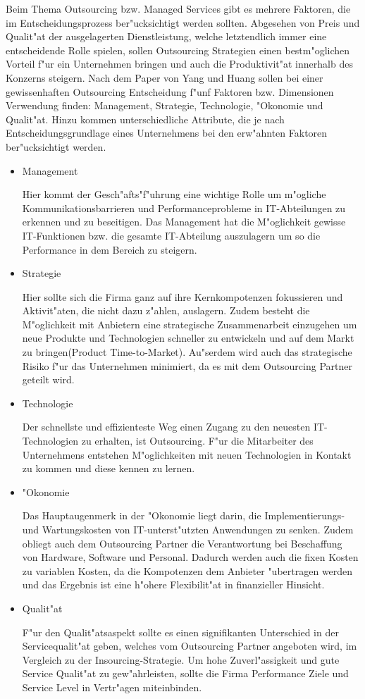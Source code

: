Beim Thema Outsourcing bzw. Managed Services gibt es mehrere Faktoren, die im Entscheidungsprozess ber"ucksichtigt werden sollten. Abgesehen von Preis und Qualit"at der ausgelagerten Dienstleistung, welche letztendlich immer eine entscheidende Rolle spielen, sollen Outsourcing Strategien einen bestm"oglichen Vorteil f"ur ein Unternehmen bringen und auch die Produktivit"at innerhalb des Konzerns steigern. Nach dem Paper von Yang und Huang \cite{Yang2000225} sollen bei einer gewissenhaften Outsourcing Entscheidung f"unf Faktoren bzw. Dimensionen Verwendung finden: Management, Strategie, Technologie, "Okonomie und Qualit"at. Hinzu kommen unterschiedliche Attribute, die je nach Entscheidungsgrundlage eines Unternehmens bei den erw"ahnten Faktoren ber"ucksichtigt werden.

\begin{itemize}
	\item Management
	
	Hier kommt der Gesch"afts"f"uhrung eine wichtige Rolle um m"ogliche Kommunikationsbarrieren und Performanceprobleme in IT-Abteilungen zu erkennen und zu beseitigen. Das Management hat die M"oglichkeit gewisse IT-Funktionen bzw. die gesamte IT-Abteilung auszulagern um so die Performance in dem Bereich zu steigern.
	\item Strategie
	
	Hier sollte sich die Firma ganz auf ihre Kernkompotenzen fokussieren und Aktivit"aten, die nicht dazu z"ahlen, auslagern. Zudem besteht die M"oglichkeit mit Anbietern eine strategische Zusammenarbeit einzugehen um neue Produkte und Technologien schneller zu entwickeln und auf dem Markt zu bringen(Product Time-to-Market). Au"serdem wird auch das strategische Risiko f"ur das Unternehmen minimiert, da es mit dem Outsourcing Partner geteilt wird.
	
	\item Technologie
	
	Der schnellste und effizienteste Weg einen Zugang zu den neuesten IT-Technologien zu erhalten, ist Outsourcing. F"ur die Mitarbeiter des Unternehmens entstehen M"oglichkeiten mit neuen Technologien in Kontakt zu kommen und diese kennen zu lernen.
	
	\item "Okonomie
	
	Das Hauptaugenmerk in der "Okonomie liegt darin, die Implementierungs- und Wartungskosten von IT-unterst"utzten Anwendungen zu senken. Zudem obliegt auch dem Outsourcing Partner die Verantwortung bei Beschaffung von Hardware, Software und Personal. Dadurch werden auch die fixen Kosten zu variablen Kosten, da die Kompotenzen dem Anbieter "ubertragen werden und das Ergebnis ist eine h"ohere Flexibilit"at in finanzieller Hinsicht. 
	
	\item Qualit"at
	
	F"ur den Qualit"atsaspekt sollte es einen signifikanten Unterschied in der Servicequalit"at geben, welches vom Outsourcing Partner angeboten wird, im Vergleich zu der Insourcing-Strategie. Um hohe Zuverl"assigkeit und gute Service Qualit"at zu gew"ahrleisten, sollte die Firma Performance Ziele und Service Level in Vertr"agen miteinbinden.
\end{itemize}
	
